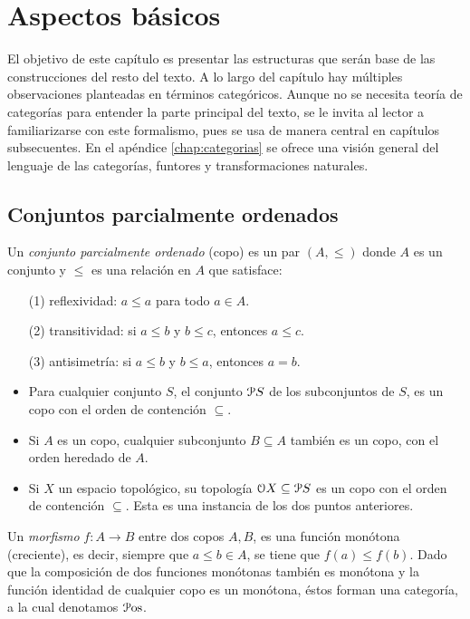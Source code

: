 \chapter{Aspectos básicos}\label{chap 1}

El objetivo de este capítulo es presentar las estructuras que serán
base de las construcciones del resto del texto. A lo largo del
capítulo hay múltiples observaciones planteadas en términos
categóricos. Aunque
no se necesita teoría de categorías para entender la parte principal
del texto, se le invita al lector a familiarizarse con este
formalismo, pues se usa de manera central en capítulos subsecuentes.
En el apéndice \ref{chap:categorias} se ofrece una visión general del
lenguaje de las categorías, funtores y transformaciones naturales.

\section{Conjuntos parcialmente ordenados}\label{copos}

Un \emph{ conjunto parcialmente ordenado } (copo) es un par $(A,\leq)$
donde $A$ es un conjunto y $\leq$ es una relación en $A$ que
satisface:
\begin{itemize}
  \item[(1)] reflexividad: $a\leq a$ para todo $a\in A$.
  \item[(2)]  transitividad: si $a\leq b$ y $b\leq c$, entonces $a\leq c$.
  \item[(3)] antisimetría: si $a\leq b$ y $b\leq a$, entonces $a=b$.
\end{itemize}

\begin{example} \leavevmode
  \begin{itemize}
    \item
      Para cualquier conjunto $S$, el conjunto $\cal PS$ de los
      subconjuntos de $S$, es un copo con el orden de contención $\subseteq$.
    \item
      Si $A$ es un copo, cualquier subconjunto $B\subseteq A$ también
      es un copo, con el orden heredado de $A$.
    \item
      Si $X$ un espacio topológico, su topología $\cal OX\subseteq\cal
      PS$ es un copo con el orden de contención $\subseteq$. Esta es
      una instancia de los dos puntos anteriores.
  \end{itemize}
\end{example}

Un \emph{morfismo} $f:A\to B$ entre dos copos $A,B$, es una función
monótona (creciente), es decir, siempre que $a\leq b\in A$, se tiene
que $f(a)\leq f(b)$.
Dado que la composición de dos funciones monótonas también es
monótona y la función identidad de cualquier copo es un monótona,
éstos forman una categoría, a la cual denotamos $\Pos$.

